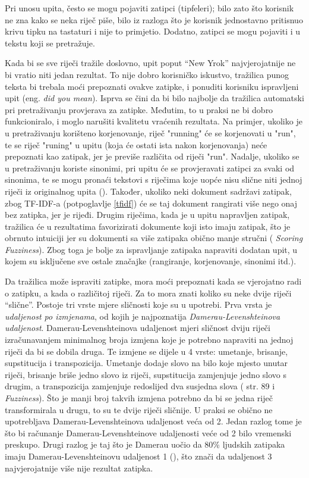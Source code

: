 \documentclass[a4paper,twoside,12pt]{scrreprt}
\begin{document}
Pri unosu upita, često se mogu pojaviti zatipci (tipfeleri); bilo zato što korisnik ne zna kako se neka riječ piše, bilo iz razloga što je korisnik jednostavno pritisnuo krivu tipku na tastaturi i nije to primjetio. Dodatno, zatipci se mogu pojaviti i u tekstu koji se pretražuje.

Kada bi se sve riječi tražile doslovno, upit poput ``New Yrok'' najvjerojatnije ne bi vratio niti jedan rezultat. To nije dobro korisničko iskustvo, tražilica punog teksta bi trebala moći prepoznati ovakve zatipke, i ponuditi korisniku ispravljeni upit (eng. \textit{did you mean}). Isprva se čini da bi bilo najbolje da tražilica automatski pri pretraživanju provjerava za zatipke. Međutim, to u praksi ne bi dobro funkcioniralo, i moglo narušiti kvalitetu vraćenih rezultata. Na primjer, ukoliko je u pretraživanju korišteno korjenovanje, riječ "running" će se korjenovati u "run", te se riječ "runing" u upitu (koja će ostati ista nakon korjenovanja) neće prepoznati kao zatipak, jer je previše različita od riječi "run". Nadalje, ukoliko se u pretraživanju koriste sinonimi, pri upitu će se provjeravati zatipci za svaki od sinonima, te se mogu pronaći tekstovi s riječima koje uopće nisu slične niti jednoj riječi iz originalnog upita (\cite{fuzzy}). Također, ukoliko neki dokument sadržavi zatipak, zbog TF-IDF-a (potpoglavlje \ref{tfidf}) će se taj dokument rangirati više nego onaj bez zatipka, jer je rijeđi. Drugim riječima, kada je u upitu napravljen zatipak, tražilica će u rezultatima favorizirati dokumente koji isto imaju zatipak, što je obrnuto intuiciji jer su dokumenti sa više zatipaka obično manje stručni (\cite{elasticguide} \textit{Scoring Fuzziness}). Zbog toga je bolje za ispravljanje zatipaka napraviti dodatan upit, u kojem su isključene sve ostale značajke (rangiranje, korjenovanje, sinonimi itd.).

Da tražilica može ispraviti zatipke, mora moći prepoznati kada se vjerojatno radi o zatipku, a kada o različitoj riječi. Za to mora znati koliko su neke dvije riječi ``slične''. Postoje tri vrste mjere sličnosti koje su u upotrebi. Prva vrsta je \textit{udaljenost po izmjenama}, od kojih je najpoznatija \textit{Damerau-Levenshteinova udaljenost}. Damerau-Levenshteinova udaljenost mjeri sličnost dviju riječi izračunavanjem minimalnog broja izmjena koje je potrebno napraviti na jednoj riječi da bi se dobila druga. Te izmjene se dijele u 4 vrste: umetanje, brisanje, supstitucija i transpozicija. Umetanje dodaje slovo na bilo koje mjesto unutar riječi, brisanje briše jedno slovo iz riječi, supstitucija zamjenjuje jedno slovo s drugim, a transpozicija zamjenjuje redoslijed dva susjedna slova (\cite{taming} str. 89 i \cite{elasticguide} \textit{Fuzziness}). Što je manji broj takvih izmjena potrebno da bi se jedna riječ transformirala u drugu, to su te dvije riječi sličnije. U praksi se obično ne upotrebljava Damerau-Levenshteinova udaljenost veća od 2. Jedan razlog tome je što bi računanje Damerau-Levenshteinove udaljenosti veće od 2 bilo vremenski preskupo. Drugi razlog je taj što je Damerau uočio da 80\% ljudskih zatipaka imaju Damerau-Levenshteinovu udaljenost 1 (\cite{damerau}), što znači da udaljenost 3 najvjerojatnije više nije rezultat zatipka.
\end{document}
